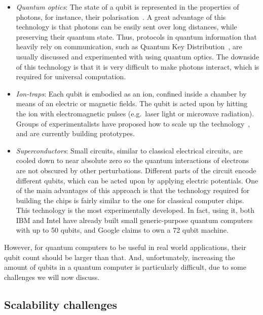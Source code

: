\begin{itemize}

\item \textit{Quantum optics}: The state of a qubit is represented in the properties of photons, for instance, their polarisation~\citep{OpticsQC}. A great advantage of this technology is that photons can be easily sent over long distances, while preserving their quantum state. Thus, protocols in quantum information that heavily rely on communication, such as Quantum Key Distribution~\citep{QKD}, are usually discussed and experimented with using quantum optics. The downside of this technology is that it is very difficult to make photons interact, which is required for universal computation.

\item \textit{Ion-traps}: Each qubit is embodied as an ion, confined inside a chamber by means of an electric or magnetic fields. The qubit is acted upon by hitting the ion with electromagnetic pulses (e.g.\ laser light or microwave radiation). Groups of experimentalists have proposed how to scale up the technology~\citep{HensingerIonTraps}, and are currently building prototypes.

\item \textit{Superconductors}: Small circuits, similar to classical electrical circuits, are cooled down to near absolute zero so the quantum interactions of electrons are not obscured by other perturbations. Different parts of the circuit encode different qubits, which can be acted upon by applying electric potentials. One of the main advantages of this approach is that the technology required for building the chips is fairly similar to the one for classical computer chips. This technology is the most experimentally developed. In fact, using it, both IBM and Intel have already built small generic-purpose quantum computers with up to 50 qubits, and Google claims to own a 72 qubit machine.

\end{itemize}

However, for quantum computers to be useful in real world applications, their qubit count should be larger than that. And, unfortunately, increasing the amount of qubits in a quantum computer is particularly difficult, due to some challenges we will now discuss.


\subsection{Scalability challenges}
\label{Challenges}

